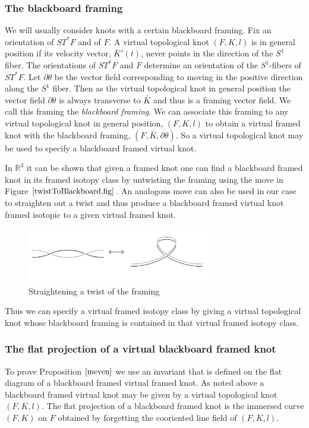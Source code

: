 \subsubsection{The blackboard framing}
We will usually consider knots with a certain blackboard framing.  Fix an orientation of $ST^*F$ and of $F$.  A virtual topological knot $(F, K, l)$ is in general position if its velocity vector, $\bar{K}'(t)$, never points in the direction of the $S^1$ fiber.  The orientations of $ST^*F$ and $F$ determine an orientation of the $S^1$-fibers of $ST^*F$.  Let $\partial \theta$ be the vector field corresponding to moving in the positive direction along the $S^1$ fiber.  Then as the virtual topological knot in general position the vector field $\partial \theta$ is always transverse to $\bar{K}$ and thus is a framing vector field.  We call this framing the {\it blackboard framing}.  We can associate this framing to any virtual topological knot in general position, $(F, K, l)$ to obtain a virtual framed knot with the blackboard framing, $(F, \bar{K}, \partial \theta)$.  So a virtual topological knot may be used to specify a blackboard framed virtual knot.

In $\mathbb{R}^3$ it can be shown that given a framed knot one can find a blackboard framed knot in its framed isotopy class by untwisting the framing using the move in Figure $\ref{twistToBlackboard.fig}$.  An analogous move can also be used in our case to straighten out a twist and thus produce a blackboard framed virtual knot framed isotopic to a given virtual framed knot.

\begin{figure}[htbp]
	\includegraphics[width=8cm]{twistToBlackboard}
	\caption{Straightening a twist of the framing}
	\label{twistToBlackboard.fig}
\end{figure}

Thus we can specify a virtual framed isotopy class by giving a virtual topological knot whose blackboard framing is contained in that virtual framed isotopy class.  

\subsubsection{The flat projection of a virtual blackboard framed knot}
To prove Proposition $\ref{meven}$ we use an invariant that is defined on the flat diagram of a blackboard framed virtual framed knot.  As noted above a blackboard framed virtual knot may be given by a virtual topological knot $(F, K, l)$.  The flat projection of a blackboard framed knot is the immersed curve $(F, K)$ on $F$ obtained by forgetting the cooriented line field of $(F, K, l)$.

